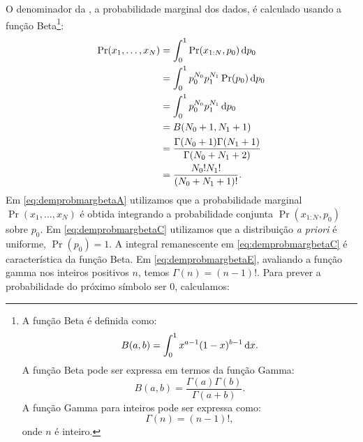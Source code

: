 O denominador da , a probabilidade marginal dos dados, é calculado usando a função Beta\footnote[][-30ex]{
A função Beta é definida como:
\begin{equation}
  B(a,b) = \int_0^1 x^{a-1} (1-x)^{b-1} \mathop{}\!\mathrm{d} x.
\end{equation}
A função Beta pode ser expressa em termos da função Gamma:
\begin{equation}
  B(a,b) = \frac{\Gamma(a) \Gamma(b)}{\Gamma(a+b)}.
\end{equation}
A função Gamma para inteiros pode ser expressa como:
\begin{equation}
  \Gamma(n) = (n-1)! ,
\end{equation}
onde $n$ é inteiro.
}:
\begin{subequations}
  \begin{align}
    \Pr(x_1, \ldots, x_N) &= \int_0^1 \Pr (x_{1:N}, p_0) \diff p_0 \label{eq:demprobmargbetaA}\\
                          &= \int_0^1 p_0^{N_0} p_1^{N_1} \Pr(p_0) \diff p_0 \label{eq:demprobmargbetaB}\\
                          &= \int_0^1 p_0^{N_0} p_1^{N_1} \diff p_0 \label{eq:demprobmargbetaC} \\
                          &= B(N_0 + 1, N_1 + 1) \\
                          &= \frac{\Gamma(N_0 + 1) \Gamma(N_1 + 1)}{\Gamma(N_0 + N_1 + 2)} \label{eq:demprobmargbetaE} \\
                          &= \frac{N_0! N_1!}{(N_0 + N_1 + 1)!}.
  \end{align}
\end{subequations}
Em \ref{eq:demprobmargbetaA} utilizamos que a probabilidade marginal $\Pr(x_1, \ldots, x_N)$ é obtida 
integrando a probabilidade conjunta $\Pr (x_{1:N}, p_0)$ sobre $p_0$.
Em \ref{eq:demprobmargbetaC} utilizamos que a distribuição \textit{a priori} é uniforme, $\Pr(p_0)=1$.
A integral remanescente em \ref{eq:demprobmargbetaC} é característica da função Beta.
Em \ref{eq:demprobmargbetaE}, avaliando a função gamma nos inteiros positivos $n$, temos $\Gamma(n) = (n-1)!$.
Para prever a probabilidade do próximo símbolo ser 0, calculamos:
